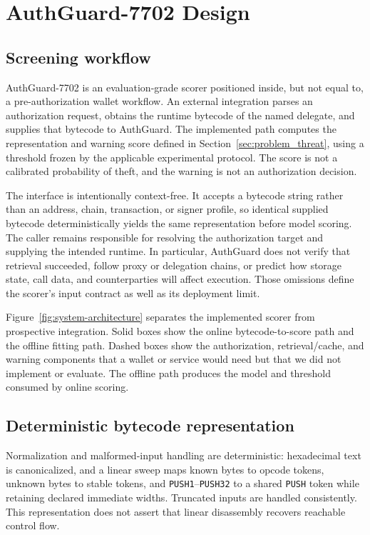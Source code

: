 \section{AuthGuard-7702 Design}
\label{sec:design}

\subsection{Screening workflow}

AuthGuard-7702 is an evaluation-grade scorer positioned inside, but not equal to, a pre-authorization wallet workflow. An external integration parses an authorization request, obtains the runtime bytecode of the named delegate, and supplies that bytecode to AuthGuard. The implemented path computes the representation and warning score defined in Section~\ref{sec:problem_threat}, using a threshold frozen by the applicable experimental protocol. The score is not a calibrated probability of theft, and the warning is not an authorization decision.

The interface is intentionally context-free. It accepts a bytecode string rather than an address, chain, transaction, or signer profile, so identical supplied bytecode deterministically yields the same representation before model scoring. The caller remains responsible for resolving the authorization target and supplying the intended runtime. In particular, AuthGuard does not verify that retrieval succeeded, follow proxy or delegation chains, or predict how storage state, call data, and counterparties will affect execution. Those omissions define the scorer's input contract as well as its deployment limit.

Figure~\ref{fig:system-architecture} separates the implemented scorer from prospective integration. Solid boxes show the online bytecode-to-score path and the offline fitting path. Dashed boxes show the authorization, retrieval/cache, and warning components that a wallet or service would need but that we did not implement or evaluate. The offline path produces the model and threshold consumed by online scoring.



\subsection{Deterministic bytecode representation}

Normalization and malformed-input handling are deterministic: hexadecimal text is canonicalized, and a linear sweep maps known bytes to opcode tokens, unknown bytes to stable tokens, and \texttt{PUSH1}--\texttt{PUSH32} to a shared \texttt{PUSH} token while retaining declared immediate widths. Truncated inputs are handled consistently. This representation does not assert that linear disassembly recovers reachable control flow.

